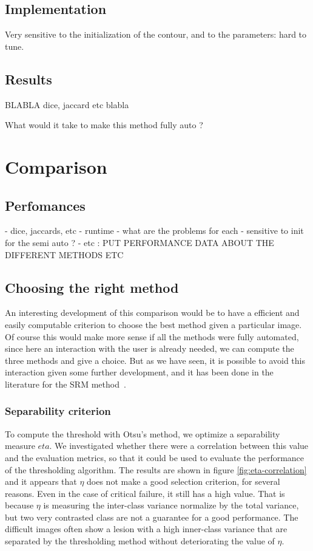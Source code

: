 \documentclass[a4paper,10pt]{article}
\begin{document}
\subsection{Implementation}
Very sensitive to the initialization of the contour, and to the parameters: hard to tune.

\subsection{Results}

BLABLA dice, jaccard etc
blabla

What would it take to make this method fully auto ?

\section{Comparison}

\subsection{Perfomances}
- dice, jaccards, etc
- runtime
- what are the problems for each
- sensitive to init for the semi auto ?
- etc : PUT PERFORMANCE DATA ABOUT THE DIFFERENT METHODS
ETC

\subsection{Choosing the right method}
An interesting development of this comparison would be to have a efficient and easily computable criterion to choose the best method given a particular image. Of course this would make more sense if all the methods were fully automated, since here an interaction with the user is already needed, we can compute the three methods and give a choice. But as we have seen, it is possible to avoid this interaction given some further development, and it has been done in the literature for the SRM method~\cite{celebi_border_2008}. 

\subsubsection{Separability criterion}
To compute the threshold with Otsu's method, we optimize a separability measure $eta$. We investigated whether there were a correlation between this value and the evaluation metrics, so that it could be used to evaluate the performance of the thresholding algorithm. The results are shown in figure \ref{fig:eta-correlation} and it appears that $\eta$ does not make a good selection criterion, for several reasons. Even in the case of critical failure, it still has a high value. That is because $\eta$ is measuring the inter-class variance normalize by the total variance, but two very contrasted class are not a guarantee for a good performance. The difficult images often show a lesion with a high inner-class variance that are separated by the thresholding method without deteriorating the value of $\eta$.
\end{document}
